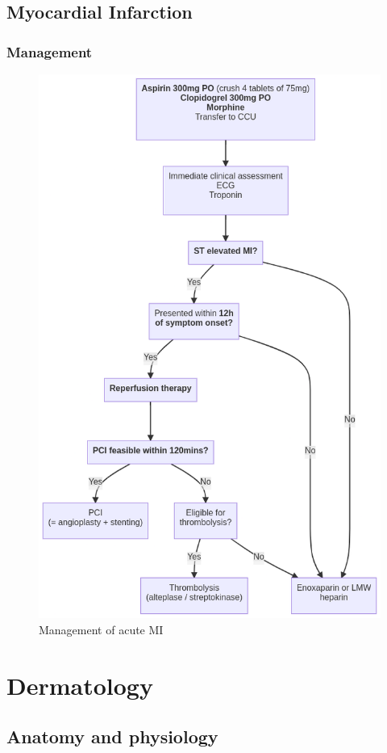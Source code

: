 \documentclass[
  12pt,
]{memoir}
\begin{document}
\hypertarget{myocardial-infarction-1}{%
\section{Myocardial Infarction}\label{myocardial-infarction-1}}

\hypertarget{management}{%
\subsection{Management}\label{management}}

\begin{figure}
\centering
\includegraphics[width=.65\textwidth]{../assets/med/MI-mx.png}
\vspace{5mm}
\caption{Management of acute MI}
\end{figure}

\pagebreak

\hypertarget{dermatology}{%
\chapter{Dermatology}\label{dermatology}}

\hypertarget{anatomy-and-physiology-1}{%
\section{Anatomy and physiology}\label{anatomy-and-physiology-1}}
\end{document}
